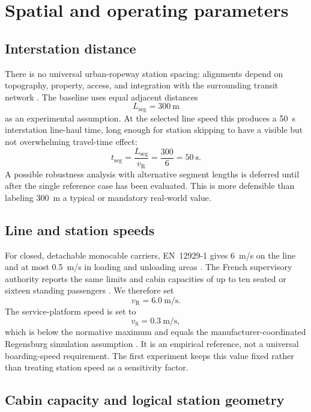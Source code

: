 \documentclass[11pt,a4paper]{scrartcl}
\newcommand{\vlinehaul}{v_{\mathrm R}}
\newcommand{\vstation}{v_{\mathrm S}}
\begin{document}
\section{Spatial and operating parameters}

\subsection{Interstation distance}

There is no universal urban-ropeway station spacing: alignments depend on
topography, property, access, and integration with the surrounding transit
network \cite{alshalalfah2012,ppiaf2020}.  The baseline uses equal adjacent
distances
\[
L_{\mathrm{seg}}=300\ \mathrm m
\]
as an experimental assumption.  At the selected line speed this produces a
50~s interstation line-haul time, long enough for station skipping to have a
visible but not overwhelming travel-time effect:
\[
t_{\mathrm{seg}}=\frac{L_{\mathrm{seg}}}{\vlinehaul}
=\frac{300}{6}=50\ \mathrm s.
\]
A possible robustness analysis with alternative segment lengths is deferred
until after the single reference case has been evaluated.  This is more
defensible than labeling 300~m a typical or mandatory real-world value.

\subsection{Line and station speeds}

For closed, detachable monocable carriers, EN~12929-1 gives 6~m/s on the line
and at most 0.5~m/s in loading and unloading areas
\cite[Sec.~9.2.5]{en12929}.  The French supervisory authority reports the same
limits and cabin capacities of up to ten seated or sixteen standing passengers
\cite{strmtgGondola}.  We therefore set
\[
\vlinehaul=6.0\ \mathrm{m/s}.
\]
The service-platform speed is set to
\[
\vstation=0.3\ \mathrm{m/s},
\]
which is below the normative maximum and equals the manufacturer-coordinated
Regensburg simulation assumption \cite{haimerl2022}.  It is an empirical
reference, not a universal boarding-speed requirement.  The first experiment
keeps this value fixed rather than treating station speed as a sensitivity
factor.

\subsection{Cabin capacity and logical station geometry}
\end{document}

